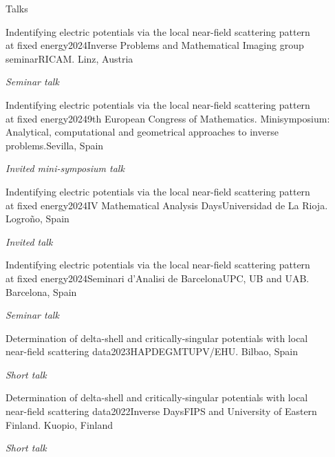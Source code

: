 \documentclass{resume} %
\newcommand{\italicitem}[1]{\item{\textit{#1}}}
\begin{document}
\begin{rSection}{Talks}
    \begin{rSubsectionNoBullet}{Indentifying electric potentials via the local
        near-field scattering pattern\\ at fixed energy}{2024}{Inverse Problems and Mathematical Imaging  group seminar}{RICAM. Linz, Austria}
        \italicitem {Seminar talk}
    \end{rSubsectionNoBullet}
    \begin{rSubsectionNoBullet}{Indentifying electric potentials via the local
        near-field scattering pattern\\ at fixed energy}{2024}{9th European Congress of Mathematics. Minisymposium: Analytical, computational and geometrical approaches to inverse problems.}{Sevilla, Spain}
        \italicitem {Invited mini-symposium talk}
    \end{rSubsectionNoBullet}
    \begin{rSubsectionNoBullet}{Indentifying electric potentials via the local
        near-field scattering pattern\\ at fixed energy}{2024}{IV Mathematical Analysis Days}{Universidad de La Rioja. Logro\~no, Spain}
        \italicitem {Invited talk}
    \end{rSubsectionNoBullet}
    \begin{rSubsectionNoBullet}{Indentifying electric potentials via the local
        near-field scattering pattern\\ at fixed energy}{2024}{Seminari d'Analisi de Barcelona}{UPC, UB and UAB. Barcelona, Spain}
        \italicitem {Seminar talk}
    \end{rSubsectionNoBullet}
    \begin{rSubsectionNoBullet}{Determination of delta-shell and critically-singular potentials
        with local \\near-field scattering data}{2023}{HAPDEGMT}{UPV/EHU. Bilbao, Spain}
        \italicitem {Short talk}
    \end{rSubsectionNoBullet}
    \begin{rSubsectionNoBullet}{Determination of delta-shell and critically-singular potentials
        with local \\near-field scattering data}{2022}{Inverse Days}{FIPS and University of Eastern Finland. Kuopio, Finland}
        \italicitem {Short talk}
    \end{rSubsectionNoBullet}
    
\end{rSection}
\end{document}

